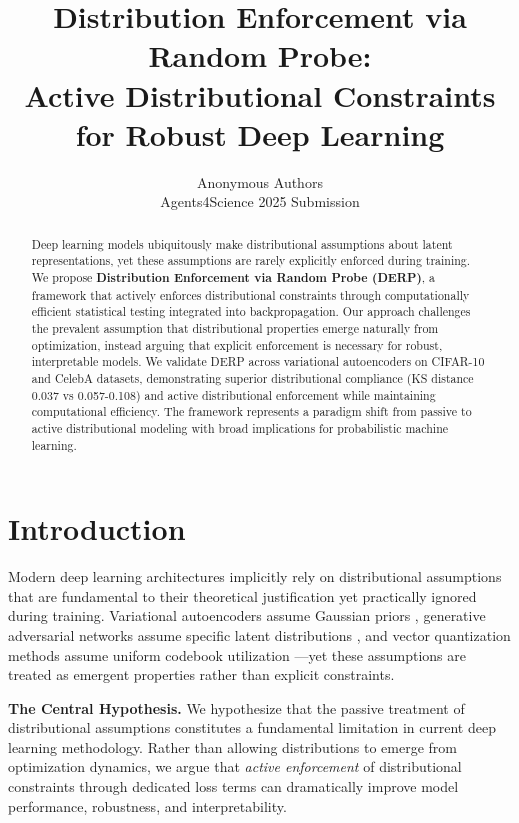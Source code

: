 \documentclass[11pt]{article}
\title{Distribution Enforcement via Random Probe:\\
Active Distributional Constraints for Robust Deep Learning}
\author{
    Anonymous Authors\\
    Agents4Science 2025 Submission
}
\date{}
\begin{document}
\maketitle

\begin{abstract}
Deep learning models ubiquitously make distributional assumptions about latent representations, yet these assumptions are rarely explicitly enforced during training. We propose \textbf{Distribution Enforcement via Random Probe (DERP)}, a framework that actively enforces distributional constraints through computationally efficient statistical testing integrated into backpropagation. Our approach challenges the prevalent assumption that distributional properties emerge naturally from optimization, instead arguing that explicit enforcement is necessary for robust, interpretable models. We validate DERP across variational autoencoders on CIFAR-10 and CelebA datasets, demonstrating superior distributional compliance (KS distance 0.037 vs 0.057-0.108) and active distributional enforcement while maintaining computational efficiency. The framework represents a paradigm shift from passive to active distributional modeling with broad implications for probabilistic machine learning.
\end{abstract}

\section{Introduction}

Modern deep learning architectures implicitly rely on distributional assumptions that are fundamental to their theoretical justification yet practically ignored during training. Variational autoencoders assume Gaussian priors \cite{kingma2014auto}, generative adversarial networks assume specific latent distributions \cite{goodfellow2014generative}, and vector quantization methods assume uniform codebook utilization \cite{oord2017neural}—yet these assumptions are treated as emergent properties rather than explicit constraints.

\textbf{The Central Hypothesis.} We hypothesize that the passive treatment of distributional assumptions constitutes a fundamental limitation in current deep learning methodology. Rather than allowing distributions to emerge from optimization dynamics, we argue that \emph{active enforcement} of distributional constraints through dedicated loss terms can dramatically improve model performance, robustness, and interpretability.
\end{document}

